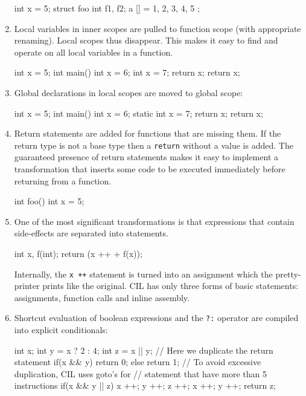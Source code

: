 \documentclass[letterpaper]{article}
\def\t#1{{\tt #1}}
\begin{document}
\begin{enumerate}
\begin{cilcode}[local]
  int x = 5; 
  struct foo { int f1, f2; } a [] = {1, 2, 3, 4, 5 };
\end{cilcode}

\item Local variables in inner scopes are pulled to function scope (with
appropriate renaming). Local scopes thus disappear. This makes it easy to find
and operate on all local variables in a function.

\begin{cilcode}[global]
  int x = 5; 
  int main() {
    int x = 6;
    { 
      int x = 7;
      return x;
    }
    return x;
  } 
\end{cilcode}

\item Global declarations in local scopes are moved to global scope:
\begin{cilcode}[global]
  int x = 5; 
  int main() {
    int x = 6;
    { 
      static int x = 7;
      return x;
    }
    return x;
  } 
\end{cilcode}

\item Return statements are added for functions that are missing them. If the
return type is not a base type then a \t{return} without a value is added.
The guaranteed presence of return statements makes it easy to implement a
transformation that inserts some code to be executed immediately before
returning from a function.
\begin{cilcode}[global]
  int foo() {
    int x = 5;
  } 
\end{cilcode}

\item One of the most significant transformations is that expressions that
contain side-effects are separated into statements. 

\begin{cilcode}[local]
   int x, f(int);
   return (x ++ + f(x));
\end{cilcode}

 Internally, the \t{x ++} statement is turned into an assignment which the
pretty-printer prints like the original. CIL has only three forms of basic
statements: assignments, function calls and inline assembly.

\item Shortcut evaluation of boolean expressions and the \t{?:} operator are
compiled into explicit conditionals:
\begin{cilcode}[local]
  int x;
  int y = x ? 2 : 4;
  int z = x || y;
  // Here we duplicate the return statement
  if(x && y) { return 0; } else { return 1; }
  // To avoid excessive duplication, CIL uses goto's for 
  // statement that have more than 5 instructions
  if(x && y || z) { x ++; y ++; z ++; x ++; y ++; return z; }
\end{cilcode}


\end{enumerate}
\end{document}
